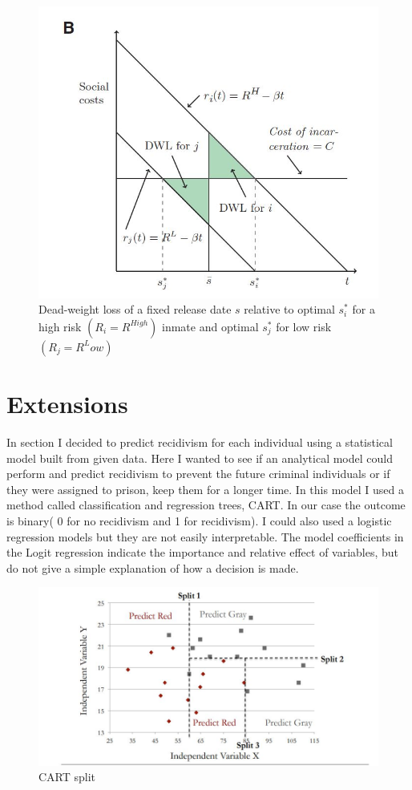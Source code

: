 \documentclass[a4paper,12pt]{article}
\begin{document}
\begin{figure}[h]
\centering
\includegraphics[scale=0.60]{fig2.JPG}
\caption{Dead-weight loss of a fixed release date $s$ relative to optimal $s^*_i$ for a high risk $(R_i = R^{High})$ inmate and optimal $s^*_j$ for low risk $(R_j = R^Low)$}
\label{fig:Figure 2}
\end{figure}

\newpage
\section{Extensions}
In section I decided to predict recidivism for each individual using a statistical model built from given data. Here I wanted to see if an analytical model could perform and predict recidivism to prevent the future criminal individuals or if they were assigned to prison, keep them for a longer time. In this model I used a method called classification and regression trees, CART. In our case the outcome is binary( 0 for no recidivism and 1 for recidivism). I could also used a logistic regression models but they are not easily interpretable. The model coefficients in the Logit regression indicate the importance and relative effect of variables, but do not give a simple explanation of how a decision is made. 


\begin{figure}[h]
\centering
\includegraphics[scale=0.60]{CART.JPG}
\caption{CART split}
\label{fig:Figure 1}
\end{figure}
\end{document}
